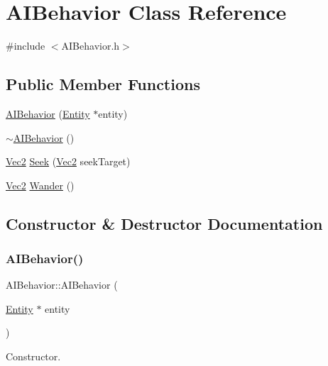 \hypertarget{class_a_i_behavior}{}\section{A\+I\+Behavior Class Reference}
\label{class_a_i_behavior}


{\ttfamily \#include $<$A\+I\+Behavior.\+h$>$}

\subsection*{Public Member Functions}
\begin{DoxyCompactItemize}
\item 
\mbox{\hyperlink{class_a_i_behavior_a7926fe64414702d698273ecd4a859df4}{A\+I\+Behavior}} (\mbox{\hyperlink{class_entity}{Entity}} $\ast$entity)
\item 
\mbox{\hyperlink{class_a_i_behavior_ae57aaaa9cb072fe0d2c510d63c0c7082}{$\sim$\+A\+I\+Behavior}} ()
\item 
\mbox{\hyperlink{struct_vec2}{Vec2}} \mbox{\hyperlink{class_a_i_behavior_aff36069dc016db7b3c174347e79063c2}{Seek}} (\mbox{\hyperlink{struct_vec2}{Vec2}} seek\+Target)
\item 
\mbox{\hyperlink{struct_vec2}{Vec2}} \mbox{\hyperlink{class_a_i_behavior_a8f2b2c143732f4a23af75c7abbe01978}{Wander}} ()
\end{DoxyCompactItemize}


\subsection{Constructor \& Destructor Documentation}
\mbox{\label{class_a_i_behavior_a7926fe64414702d698273ecd4a859df4}} 
\subsubsection{\texorpdfstring{A\+I\+Behavior()}{AIBehavior()}}
{\footnotesize\ttfamily A\+I\+Behavior\+::\+A\+I\+Behavior (\begin{DoxyParamCaption}\item[{\mbox{\hyperlink{class_entity}{Entity}} $\ast$}]{entity }\end{DoxyParamCaption})}

Constructor. \mbox{\label{class_a_i_behavior_ae57aaaa9cb072fe0d2c510d63c0c7082}} 
